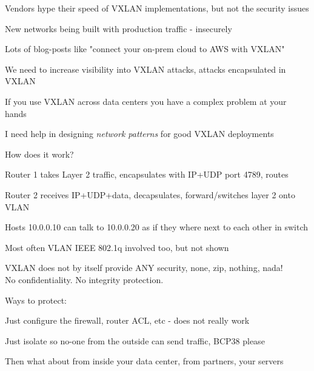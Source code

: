 \documentclass[Screen16to9,17pt]{foils}
\begin{document}

\begin{list2}
\item Vendors hype their speed of VXLAN implementations, but not the security issues
\item New networks being built with production traffic - insecurely
\item Lots of blog-posts like "connect your on-prem cloud to AWS with VXLAN"
\item We need to increase visibility into VXLAN attacks, attacks encapsulated in VXLAN
\item If you use VXLAN across data centers you have a complex problem at your hands
\item I need help in designing \emph{network patterns} for good VXLAN deployments
\end{list2}





How does it work?

\begin{list2}
\item Router 1 takes Layer 2 traffic, encapsulates with IP+UDP port 4789, routes
\item Router 2 receives IP+UDP+data, decapsulates, forward/switches layer 2 onto VLAN
\item Hosts 10.0.0.10 can talk to 10.0.0.20 as if they where next to each other in switch
\item Most often VLAN IEEE 802.1q involved too, but not shown
\end{list2}



VXLAN does not by itself provide ANY security,
none, zip, nothing, nada! \\
No confidentiality. No integrity protection.

\vskip 5mm

Ways to protect:
\begin{list2}
\item Just configure the firewall, router ACL, etc - does not really work
\item Just isolate so no-one from the outside can send traffic, BCP38 please
\item Then what about from inside your data center, from partners, your servers
\end{list2}
\end{document}
